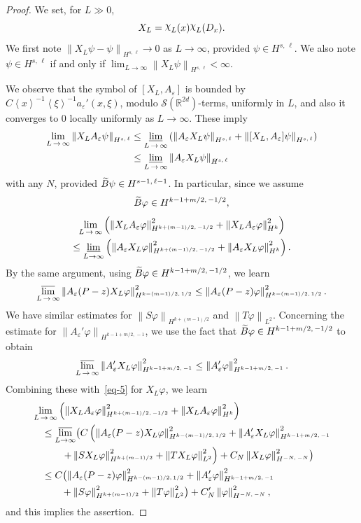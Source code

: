 \documentclass[10pt]{amsart}
\theoremstyle{definition}
\newcommand*\e{\varepsilon}
\newcommand*\f{\varphi}
\newcommand*\g{\psi}
\renewcommand*\i{\mbox{\raisebox{.5ex}{$\chi$}}}
\newcommand*\x{\xi}
\newcommand*\re{\mathbb{R}}
\newcommand{\clS}{\mathcal{S}}
\newcommand{\jap}[1]{\left\langle #1 \right\rangle}
\newcommand{\norm}[1]{\left\| #1 \right\|}
\newcommand{\bigpare}[1]{\bigl(#1\bigr)}
\let\oldtilde\tilde
\renewcommand*{\tilde}[1]{\mathchoice{\widetilde{#1}}{\widetilde{#1}}{\oldtilde{#1}}{\oldtilde{#1}}}
\begin{document}
\begin{proof}
We set, for $L\gg 0$,
\[
X_L =\i_L(x)\i_L(D_x).
\]
We first note $\norm{X_L\g-\g}_{H^{s,\,\ell}}\to 0$ as $L\to\infty$, provided $\g\in H^{s,\,\ell}$. We also note $\g\in H^{s,\,\ell}$ if and only if $\lim_{L\to\infty}\norm{X_L\g}_{H^{s,\,\ell}}<\infty$.

We observe that the symbol of $[X_L,A_\e]$ is bounded by $C\jap{x}^{-1}\jap{\x}^{-1}a_\e'(x,\x)$, modulo $\clS(\re^{2d})$-terms, uniformly in $L$, and also it converges to 0 locally uniformly as $L\to\infty$. These imply
\begin{align*}
\lim_{L\,\to\,\infty} \norm{X_L A_\e\g}_{H^{s,\,\ell}} &\leq \varliminf_{L\,\to\,\infty} \left(\norm{A_\e X_L \g}_{H^{s,\,\ell}} + \norm{[X_L,A_\e]\g}_{H^{s,\,\ell}} \right)\\
&\leq \varliminf_{L\,\to\,\infty} \norm{A_\e X_L \g}_{H^{s,\,\ell}}
\end{align*}
with any $N$, provided $\tilde{B}\g\in H^{s-1,\,\ell-1}$. In particular, since we assume
\[
\tilde{B}\f\in H^{k-1+m/2,\,-1/2},
\]
\begin{multline*}
\lim_{L\,\to\,\infty} \left(\norm{X_L A_\e\f}_{H^{k+(m-1)/2,\,-1/2}}^2 +\norm{X_L A_\e\f}_{H^k}^2\right)\\
\leq \varliminf_{L\to\infty}\left(\norm{A_\e X_L \f}_{H^{k+(m-1)/2,\,-1/2}}^2 +\norm{A_\e X_L \f}_{H^k}^2\right).
\end{multline*}
By the same argument, using $\tilde{B}\f\in H^{k-1+m/2,\,-1/2}$, we learn
\[
\varlimsup_{L\,\to\,\infty} \norm{A_\e (P-z) X_L\f}_{H^{k-(m-1)/2,\,1/2}}^2
\leq \norm{A_\e (P-z)\f}_{H^{k-(m-1)/2,\,1/2}}^2.
\]
We have similar estimates for $\norm{S\f}_{H^{k+(m-1)/2}}$ and $\norm{T\f}_{L^2}$. Concerning the estimate for $\norm{A_\e'\f}_{H^{k-1+m/2,\,-1}}$, we use the fact that $\tilde B\f\in H^{k-1+m/2,\,-1/2}$ to obtain
\[
\varlimsup_{L\,\to\,\infty} \norm{A_\e' X_L\f}_{H^{k-1+m/2,\,-1}}^2
\leq \norm{A'_\e\f}_{H^{k-1+m/2,\,-1}}^2.
\]
Combining these with~\eqref{eq-5} for $X_L\f$, we learn
\begin{align*}
& \lim_{L\,\to\,\infty} \left(\norm{X_L A_\e\f}_{H^{k+(m-1)/2,\,-1/2}}^2 +\norm{X_L A_\e\f}_{H^k}^2\right)\\
&\quad \leq \varlimsup_{L\to\infty} \bigpare{ C\left(\norm{A_\e (P-z) X_L\f}_{H^{k-(m-1)/2,\,1/2}}^2 +\norm{A_\e'X_L \f}_{H^{k-1+m/2,\,-1}}^2 \right.\\
&\left.\quad\quad\quad + \norm{SX_L \f}_{H^{k+(m-1)/2}}^2 +\norm{TX_L \f}_{L^2}^2\right) +C_N \norm{X_L \f}_{H^{-N,\,-N}}^2} \\
&\quad \leq C\bigpare{\norm{A_\e(P-z)\f}_{H^{k-(m-1)/2,\,1/2}}^2 +\norm{A'_\e\f}_{H^{k-1+m/2,\,-1}}^2 \\
&\quad \quad\quad+\norm{S\f}_{H^{k+(m-1)/2}}^2 +\norm{T\f}_{L^2}^2} +C'_N \norm{\f}_{H^{-N,\,-N}}^2,
\end{align*}
and this implies the assertion.
\end{proof}
\end{document}
